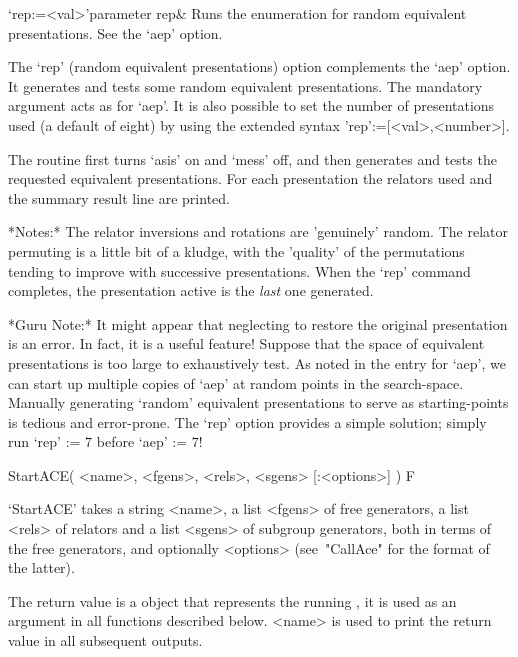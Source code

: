 \beginitems

\>`rep:=<val>'{parameter rep}&
Runs the enumeration for random equivalent presentations. See the `aep'
option.

\enditems

The  `rep' (random  equivalent presentations)  option  complements the
`aep'  option.    It  generates  and  tests   some  random  equivalent
presentations.  The mandatory argument acts  as for `aep'.  It is also
possible to set the number  of presentations used (a default of eight)
by using the extended syntax 'rep':=[<val>,<number>].

The routine first  turns `asis' on and `mess'  off, and then generates
and   tests  the   requested  equivalent   presentations.    For  each
presentation  the  relators  used  and  the summary  result  line  are
printed.

*Notes:*
The  relator inversions  and  rotations are  'genuinely' random.   The
relator permuting is  a little bit of a kludge,  with the 'quality' of
the  permutations tending  to improve  with  successive presentations.
When the `rep' command completes,  the presentation active is the {\it
last} one generated.

*Guru Note:*
It might  appear that neglecting to restore  the original presentation
is an error.  In fact, it is a useful feature!  Suppose that the space
of  equivalent presentations is  too large  to exhaustively  test.  As
noted in the  entry for `aep', we can start  up multiple copies of
`aep'  at  random points  in  the  search-space.  Manually  generating
`random'  equivalent  presentations  to  serve as  starting-points  is
tedious and error-prone.  The `rep' option provides a simple solution;
simply run `rep' := $7$ before `aep' := $7$!



\>StartACE( <name>, <fgens>, <rels>, <sgens> [:<options>] ) F

`StartACE' takes a string <name>, a list <fgens> of free generators,
a list <rels> of relators and a list <sgens> of subgroup generators,
both in terms of the free generators, and optionally <options>
(see~"CallAce" for the format of the latter).

The return value is a {\GAP} object that represents the running {\ACE},
it is used as an argument in all functions described below.
<name> is used to print the return value in all subsequent outputs.

